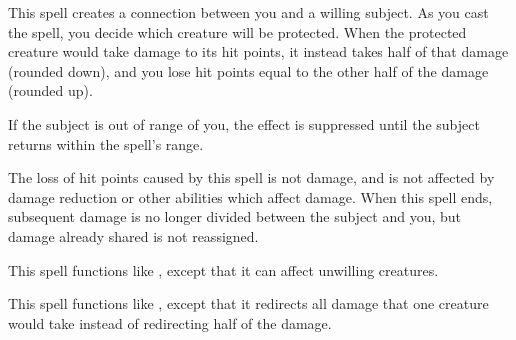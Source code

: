 \spellrng{\rngmed}
\begin{spelleffect}
  This spell creates a connection between you and a willing subject. As you cast the spell, you decide which creature will be protected. When the protected creature would take damage to its hit points, it instead takes half of that damage (rounded down), and you lose hit points equal to the other half of the damage (rounded up).

  If the subject is out of range of you, the effect is suppressed until the subject returns within the spell's range.
\end{spelleffect}
\begin{spellnotes}
  The loss of hit points caused by this spell is not damage, and is not affected by damage reduction or other abilities which affect damage. When this spell ends, subsequent damage is no longer divided between the subject and you, but damage already shared is not reassigned.
\end{spellnotes}

\begin{spelleffect}
  This spell functions like , except that it can affect unwilling creatures. 
\end{spelleffect}

\begin{spelleffect}
  This spell functions like , except that it redirects all damage that one creature would take instead of redirecting half of the damage.
\end{spelleffect}


